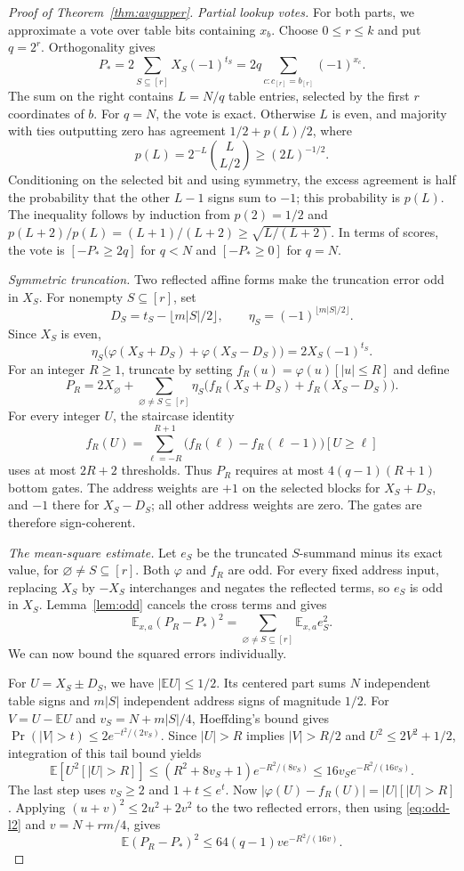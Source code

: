 \documentclass[11pt]{article}
\begin{document}
\begin{proof}[Proof of Theorem~\ref{thm:avgupper}]
\emph{Partial lookup votes.}
For both parts, we approximate a vote over table bits containing $x_b$.
Choose $0\le r\le k$ and put $q=2^r$. Orthogonality gives
$$
P_*=2\sum_{S\subseteq[r]}X_S(-1)^{t_S}
 =2q\sum_{c:c_{[r]}=b_{[r]}}(-1)^{x_c}.
$$
The sum on the right contains $L=N/q$ table entries, selected by the
first $r$ coordinates of $b$. For $q=N$, the vote is exact. Otherwise
$L$ is even, and majority with ties outputting zero has agreement
$1/2+p(L)/2$, where
$$
p(L)=2^{-L}\binom L{L/2}\ge(2L)^{-1/2}.
$$
Conditioning on the selected bit and using symmetry, the excess
agreement is half the probability that the other $L-1$ signs sum to
$-1$; this probability is $p(L)$.
The inequality follows by induction from $p(2)=1/2$ and
$p(L+2)/p(L)=(L+1)/(L+2)\ge\sqrt{L/(L+2)}$.
In terms of scores, the vote is $[-P_*\ge2q]$ for $q<N$ and
$[-P_*\ge0]$ for $q=N$.

\emph{Symmetric truncation.}
Two reflected affine forms make the truncation error odd in $X_S$.
For nonempty $S\subseteq[r]$, set
$$D_S=t_S-\lfloor m|S|/2\rfloor,\qquad
\eta_S=(-1)^{\lfloor m|S|/2\rfloor}.$$
Since $X_S$ is even,
$$
\eta_S\bigl(\varphi(X_S+D_S)+\varphi(X_S-D_S)\bigr)
 =2X_S(-1)^{t_S}.
$$
For an integer $R\ge1$, truncate by setting
$f_R(u)=\varphi(u)[|u|\le R]$ and define
$$
P_R=2X_\varnothing+
\sum_{\varnothing\ne S\subseteq[r]}
\eta_S\bigl(f_R(X_S+D_S)+f_R(X_S-D_S)\bigr).
$$
For every integer $U$, the staircase identity
$$
f_R(U)=\sum_{\ell=-R}^{R+1}
\bigl(f_R(\ell)-f_R(\ell-1)\bigr)[U\ge\ell]
$$
uses at most $2R+2$ thresholds. Thus $P_R$ requires at most
$4(q-1)(R+1)$ bottom gates. The address weights are $+1$ on the selected
blocks for $X_S+D_S$, and $-1$ there for $X_S-D_S$; all other address
weights are zero. The gates are therefore sign-coherent.

\emph{The mean-square estimate.}
Let $e_S$ be the truncated $S$-summand minus its exact value, for
$\varnothing\ne S\subseteq[r]$. Both $\varphi$ and $f_R$ are odd.
For every fixed address input, replacing $X_S$ by $-X_S$ interchanges
and negates the reflected terms, so $e_S$ is odd in $X_S$.
Lemma~\ref{lem:odd} cancels the cross terms and gives
\begin{equation}\label{eq:odd-l2}
\mathbb E_{x,a}(P_R-P_*)^2=\sum_{\varnothing\ne S\subseteq[r]}\mathbb E_{x,a}e_S^2.
\end{equation}
We can now bound the squared errors individually.

For $U=X_S\pm D_S$, we have $|\mathbb EU|\le1/2$. Its centered part
sums $N$ independent table signs and $m|S|$ independent address signs
of magnitude $1/2$. For $V=U-\mathbb EU$ and $v_S=N+m|S|/4$,
Hoeffding's bound gives
$\Pr(|V|>t)\le2e^{-t^2/(2v_S)}$.
Since $|U|>R$ implies $|V|>R/2$ and $U^2\le2V^2+1/2$, integration of
this tail bound yields
$$
\mathbb E[U^2[|U|>R]]
 \le(R^2+8v_S+1)e^{-R^2/(8v_S)}
 \le16v_Se^{-R^2/(16v_S)}.
$$
The last step uses $v_S\ge2$ and $1+t\le e^t$.
Now $|\varphi(U)-f_R(U)|=|U|[|U|>R]$. Applying
$(u+v)^2\le2u^2+2v^2$ to the two reflected errors, then using
\eqref{eq:odd-l2} and $v=N+rm/4$, gives
$$
\mathbb E(P_R-P_*)^2\le64(q-1)v e^{-R^2/(16v)}.
$$


\end{proof}
\end{document}
